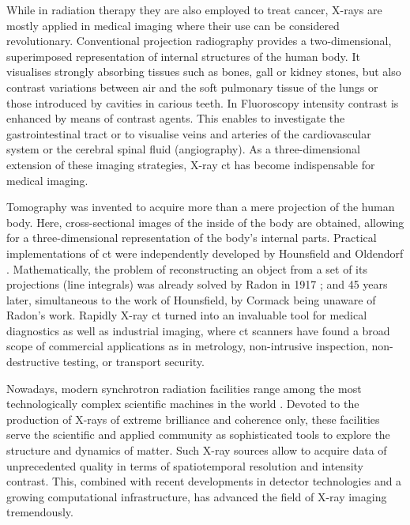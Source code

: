 \documentclass[
twoside,
openright,
titlepage,
numbers=noenddot,
headinclude,
fleqn,
a4paper,
footinclude=true,
cleardoublepage=empty,
abstractoff,
BCOR=5mm,
paper=a4,
fontsize=11pt,
british,ngerman,american,
]{scrreprt}
\begin{document}
While in radiation therapy they are also employed to treat cancer,
X-rays are mostly applied in medical imaging where their use can be
considered revolutionary. Conventional projection radiography provides
a two-dimensional, superimposed representation of internal structures
of the human body.  It visualises strongly absorbing tissues such as
bones, gall or kidney stones, but also contrast variations between air
and the soft pulmonary tissue of the lungs or those introduced by
cavities in carious teeth.  In Fluoroscopy intensity contrast is
enhanced by means of contrast agents.  This enables to investigate the
gastrointestinal tract or to visualise veins and arteries of the
cardiovascular system or the cerebral spinal fluid (angiography).  As
a three-dimensional extension of these imaging strategies, X-ray
\acl{ct} has become indispensable for medical imaging.

Tomography was invented to acquire more than a mere projection of the
human body.  Here, cross-sectional images of the inside of the body
are obtained, allowing for a three-dimensional representation of the
body's internal parts.  Practical implementations of \acl{ct} were
independently developed by Hounsfield \cite{Hounsfield1973} and
Oldendorf \cite{Oldendorf1961}.  Mathematically, the problem of
reconstructing an object from a set of its projections (line
integrals) was already solved by Radon in 1917 \cite{Radon1917}; and
45 years later, simultaneous to the work of Hounsfield, by Cormack
\cite{Cormack1963,Cormack1964} being unaware of Radon's work.
Rapidly X-ray \acf{ct} turned into an invaluable tool for medical
diagnostics as well as industrial imaging, where \ac{ct} scanners have
found a broad scope of commercial applications as \eg{} in metrology,
non-intrusive inspection, non-destructive testing, or transport
security.

Nowadays, modern synchrotron radiation facilities range among the most
technologically complex scientific machines in the world
\cite{Wilson1996}.  Devoted to the production of X-rays of extreme
brilliance and coherence only, these facilities serve the scientific
and applied community as sophisticated tools to explore the structure
and dynamics of matter.
Such X-ray sources allow to acquire data of unprecedented quality in
terms of spatiotemporal resolution and intensity contrast.  This,
combined with recent developments in detector technologies
\cite{Martin2006} and a growing computational infrastructure, has
advanced the field of X-ray imaging tremendously.
\end{document}
